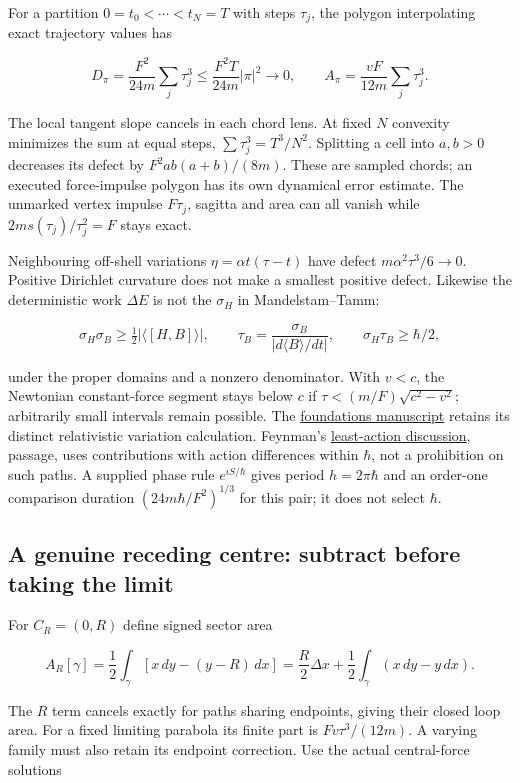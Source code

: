 \documentclass[11pt,a4paper]{article}
\begin{document}
For a partition \(0=t_0<\cdots<t_N=T\) with steps \(\tau_j\), the
polygon interpolating exact trajectory values has

\[D_\pi=\frac{F^2}{24m}\sum_j\tau_j^3
 \le\frac{F^2T}{24m}|\pi|^2\longrightarrow0,\qquad
A_\pi=\frac{vF}{12m}\sum_j\tau_j^3.\]

The local tangent slope cancels in each chord lens. At fixed \(N\)
convexity minimizes the sum at equal steps, \(\sum\tau_j^3=T^3/N^2\).
Splitting a cell into \(a,b>0\) decreases its defect by
\(F^2ab(a+b)/(8m)\). These are sampled chords; an executed force-impulse
polygon has its own dynamical error estimate. The unmarked vertex
impulse \(F\tau_j\), sagitta and area can all vanish while
\(2ms(\tau_j)/\tau_j^2=F\) stays exact.

Neighbouring off-shell variations \(\eta=\alpha t(\tau-t)\) have defect
\(m\alpha^2\tau^3/6\to0\). Positive Dirichlet curvature does not make a
smallest positive defect. Likewise the deterministic work \(\Delta E\)
is not the \(\sigma_H\) in Mandelstam--Tamm:

\[\sigma_H\sigma_B\ge\tfrac12|\langle[H,B]\rangle|,\qquad
\tau_B=\frac{\sigma_B}{|d\langle B\rangle/dt|},\qquad
\sigma_H\tau_B\ge\hbar/2,\]

under the proper domains and a nonzero denominator. With \(v<c\), the
Newtonian constant-force segment stays below \(c\) if
\(\tau<(m/F)\sqrt{c^2-v^2}\); arbitrarily small intervals remain
possible. The \href{../papers/action-gap-foundations.tex}{foundations
manuscript} retains its distinct relativistic variation calculation.
Feynman's \href{../docs/Feynman_LeastAction_II19.md}{least-action
discussion}, passage, uses contributions with action differences within
\(\hbar\), not a prohibition on such paths. A supplied phase rule
\(e^{iS/\hbar}\) gives period \(h=2\pi\hbar\) and an order-one
comparison duration \((24m\hbar/F^2)^{1/3}\) for this pair; it does not
select \(\hbar\).

\subsection{A genuine receding centre: subtract before taking the
limit}\label{a-genuine-receding-centre-subtract-before-taking-the-limit}

For \(C_R=(0,R)\) define signed sector area

\[A_R[\gamma]=\frac12\int_\gamma[x\,dy-(y-R)\,dx]
 =\frac R2\Delta x+\frac12\int_\gamma(x\,dy-y\,dx).\]

The \(R\) term cancels exactly for paths sharing endpoints, giving their
closed loop area. For a fixed limiting parabola its finite part is
\(Fv\tau^3/(12m)\). A varying family must also retain its endpoint
correction. Use the actual central-force solutions
\end{document}
